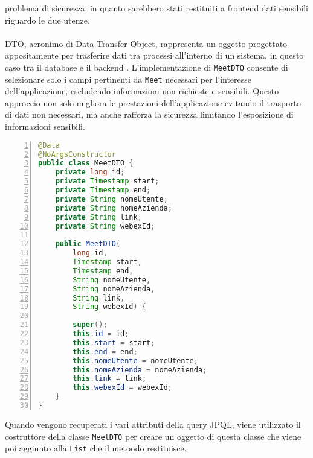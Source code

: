 problema di sicurezza, in quanto sarebbero stati restituiti a frontend dati sensibili riguardo le due utenze.
\\
\\
DTO, acronimo di Data Transfer Object, rappresenta un oggetto progettato appositamente per trasferire dati tra processi 
all'interno di un sistema, in questo caso tra il database e il backend \cite{DataTransferObject}. L'implementazione di \texttt{MeetDTO} consente di selezionare 
solo i campi pertinenti da \texttt{Meet} necessari per l'interesse dell'applicazione, escludendo informazioni non richieste e sensibili.
Questo approccio non solo migliora le prestazioni dell'applicazione evitando il trasporto di dati non necessari, 
ma anche rafforza la sicurezza limitando l'esposizione di informazioni sensibili.
\begin{lstlisting}[language=java, frame=lines, basicstyle=\ttfamily\scriptsize, numbers=left]
@Data
@NoArgsConstructor
public class MeetDTO {
    private long id;
    private Timestamp start;
    private Timestamp end;
    private String nomeUtente;
    private String nomeAzienda;
    private String link;
    private String webexId;
        
    public MeetDTO(
        long id, 
        Timestamp start, 
        Timestamp end, 
        String nomeUtente, 
        String nomeAzienda, 
        String link,
        String webexId) {
            
        super();
        this.id = id;
        this.start = start;
        this.end = end;
        this.nomeUtente = nomeUtente;
        this.nomeAzienda = nomeAzienda;
        this.link = link;
        this.webexId = webexId;
    }       
}
\end{lstlisting}
Quando vengono recuperati i vari attributi della query JPQL, 
viene utilizzato il costruttore della classe \texttt{MeetDTO} per creare un 
oggetto di questa classe che viene poi aggiunto alla \texttt{List} che il metoodo restituisce.